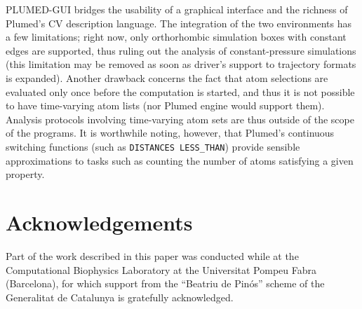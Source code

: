 \documentclass[preprint,12pt]{elsarticle}
\begin{document}
PLUMED-GUI bridges the usability of a graphical interface and the
richness of Plumed's CV description language.  The integration of the
two environments has a few limitations; right now, only orthorhombic
simulation boxes with constant edges are supported, thus ruling out
the analysis of constant-pressure simulations (this limitation may be
removed as soon as driver's support to trajectory formats is
expanded). Another drawback concerns the fact that atom selections are
evaluated only once before the computation is started, and thus it is
not possible to have time-varying atom lists (nor Plumed engine would
support them).  Analysis protocols involving time-varying atom sets
are thus outside of the scope of the programs. It is worthwhile
noting, however, that Plumed's continuous switching functions (such as
\texttt{DISTANCES LESS\_THAN}) provide sensible approximations to
tasks such as counting the number of atoms satisfying a given
property.







\section{Acknowledgements}

Part of the work described in this paper was conducted while at the
Computational Biophysics Laboratory at the Universitat Pompeu Fabra
(Barcelona), for which support from the ``Beatriu de Pin\'os'' scheme
of the Generalitat de Catalunya is gratefully acknowledged.







\end{document}
